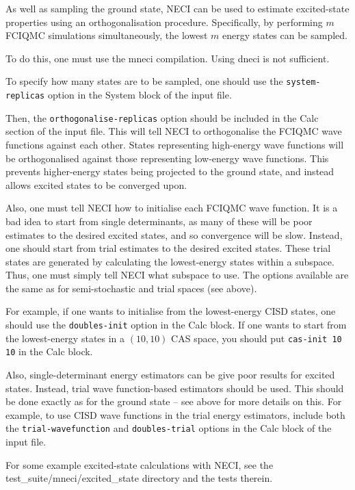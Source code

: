 \documentclass[a4paper,notitlepage]{scrreprt}
\let\code\lstinline
\begin{document}
    As well as sampling the ground state, NECI can be used to estimate
    excited-state properties using an orthogonalisation procedure.
    Specifically, by performing $m$ FCIQMC simulations simultaneously,
    the lowest $m$ energy states can be sampled.

    To do this, one must use the mneci compilation. Using dneci is not
    sufficient.

    To specify how many states are to be sampled, one should use the
    \code{system-replicas} option in the System block of the input file.

    Then, the \code{orthogonalise-replicas} option should be included in
    the Calc section of the input file. This will tell NECI to orthogonalise
    the FCIQMC wave functions against each other. States representing
    high-energy wave functions will be orthogonalised against those
    representing low-energy wave functions. This prevents higher-energy
    states being projected to the ground state, and instead allows
    excited states to be converged upon.

    Also, one must tell NECI how to initialise each FCIQMC wave function.
    It is a bad idea to start from single determinants, as many of these
    will be poor estimates to the desired excited states, and so
    convergence will be slow. Instead, one should start from trial estimates
    to the desired excited states. These trial states are generated by
    calculating the lowest-energy states within a subspace.
    Thus, one must simply tell NECI what subspace to use. The options
    available are the same as for semi-stochastic and trial spaces (see above).

    For example, if one wants to initialise from the lowest-energy CISD states,
    one should use the \code{doubles-init} option in the Calc block. If one
    wants to start from the lowest-energy states in a $(10,10)$ CAS space, you
    should put \code{cas-init 10 10} in the Calc block.

    Also, single-determinant energy estimators can be give poor results for
    excited states. Instead, trial wave function-based estimators should be
    used. This should be done exactly as for the ground state -- see above for
    more details on this. For example, to use CISD wave functions in the trial
    energy estimators, include both the \code{trial-wavefunction} and
    \code{doubles-trial} options in the Calc block of the input file.

    For some example excited-state calculations with NECI, see the
    test\_suite/mneci/excited\_state directory and the tests therein.
\end{document}
